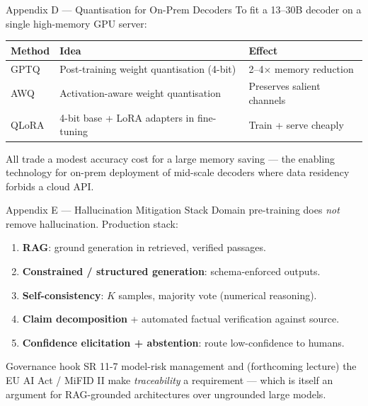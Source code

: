 \documentclass[9pt,t]{beamer}
\begin{document}
\begin{frame}[noframenumbering]{Appendix D --- Quantisation for On-Prem Decoders}
To fit a 13--30B decoder on a single high-memory GPU server:
\small
\begin{tabular}{lll}
\toprule
\textbf{Method} & \textbf{Idea} & \textbf{Effect} \\
\midrule
GPTQ  & Post-training weight quantisation (4-bit) & 2--4$\times$ memory reduction \\
AWQ   & Activation-aware weight quantisation & Preserves salient channels \\
QLoRA & 4-bit base + LoRA adapters in fine-tuning & Train + serve cheaply \\
\bottomrule
\end{tabular}

\medskip
All trade a modest accuracy cost for a large memory saving --- the enabling
technology for on-prem deployment of mid-scale decoders where data residency
forbids a cloud API.
\end{frame}

\begin{frame}[noframenumbering]{Appendix E --- Hallucination Mitigation Stack}
Domain pre-training does \emph{not} remove hallucination. Production stack:
\begin{enumerate}
  \item \textbf{RAG}: ground generation in retrieved, verified passages.
  \item \textbf{Constrained / structured generation}: schema-enforced outputs.
  \item \textbf{Self-consistency}: $K$ samples, majority vote (numerical reasoning).
  \item \textbf{Claim decomposition} + automated factual verification against source.
  \item \textbf{Confidence elicitation + abstention}: route low-confidence to humans.
\end{enumerate}

\medskip
\begin{block}{Governance hook}
SR 11-7 model-risk management and (forthcoming lecture) the EU AI Act / MiFID II
make \emph{traceability} a requirement --- which is itself an argument for
RAG-grounded architectures over ungrounded large models.
\end{block}
\end{frame}
\end{document}
